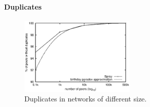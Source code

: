 
\vspace{-7pt}
\paragraph{Duplicates}

\begin{figure}
  \centering
  \includegraphics[width=0.49\textwidth]{img/duplicates.eps}
  \caption{\label{fig:duplicates}Duplicates in networks of different size.}
\end{figure}

